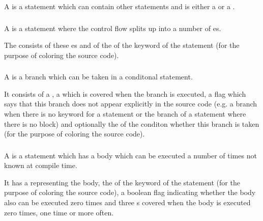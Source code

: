 A  is a statement which can contain other statements and
is either a  or a .

\subsubsection[ConditionalStatement]{}

A  is a statement where the control flow splits up
into a number of es.

The  consists of these es and of the
 of the keyword of the statement (for the purpose of
coloring the source code).

\subsubsection[Branch]{}

A  is a branch which can be taken in a conditonal statement.

It consists of a ,
a  which is covered when the branch
is executed, a flag which says that this branch does not appear explicitly
in the source code (e.g. a  branch when there is no 
keyword for a  statement or the  branch of a
 statement where there is no  block) and 
optionally the  of the conditon whether this branch is taken
(for the purpose of coloring the source code).

\subsubsection[LoopingStatement]{}

A  is a statement which has a body which can be executed
a number of times not known at compile time.

It has a  representing the body, the 
of the keyword of the statement (for the purpose of coloring the source code),
a boolean flag indicating whether the body also can be executed zero times
and three s covered when the body is executed zero times,
one time or more often.

\subsubsection[StatementSequence]{}

